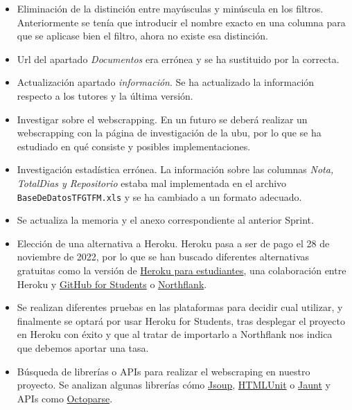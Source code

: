\begin{itemize}
	\item Eliminación de la distinción entre mayúsculas y minúscula en los filtros. Anteriormente se tenía que introducir el nombre exacto en una columna para que se aplicase bien el filtro, ahora no existe esa distinción.
	
	\item Url del apartado \emph{Documentos} era errónea y se ha sustituido por la correcta.
	
	\item Actualización apartado \emph{información}. Se ha actualizado la información respecto a los tutores y la última versión.
	
	\item Investigar sobre el webscrapping. En un futuro se deberá realizar un webscrapping con la página de investigación de la ubu, por lo que se ha estudiado en qué consiste y posibles implementaciones.
	
	\item Investigación estadística errónea. La información sobre las columnas \emph{Nota, TotalDias y Repositorio} estaba mal implementada en el archivo \texttt{BaseDeDatosTFGTFM.xls} y se ha cambiado a un formato adecuado.
	
	\item Se actualiza la memoria y el anexo correspondiente al anterior Sprint.
	
	\item Elección de una alternativa a Heroku. Heroku pasa a ser de pago el 28 de noviembre de 2022, por lo que se han buscado diferentes alternativas gratuitas como la versión de \href{https://blog.heroku.com/github-student-developer-program}{Heroku para estudiantes}, una colaboración entre Heroku y \href{https://education.github.com/students}{GitHub for Students} o \href{https://northflank.com/}{Northflank}. 
	
	\item Se realizan diferentes pruebas en las plataformas para decidir cual utilizar, y finalmente se optará por usar Heroku for Students, tras desplegar el proyecto en Heroku con éxito y que al tratar de importarlo a Northflank nos indica que debemos aportar una tasa.
	
	\item Búsqueda de librerías o APIs para realizar el webscraping en nuestro proyecto. Se analizan algunas librerías cómo \href{https://jsoup.org/}{Jsoup}, \href{https://htmlunit.sourceforge.io/}{HTMLUnit} o \href{https://jaunt-api.com/}{Jaunt} y APIs como \href{https://www.octoparse.es/blog/web-scraping-api-para-extraccion-de-datos}{Octoparse}.
	

\end{itemize}
